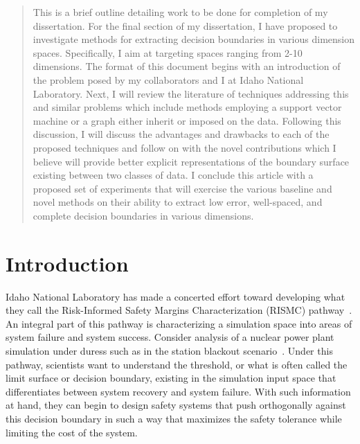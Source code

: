 \documentclass[12pt]{article}
\begin{document}
\maketitle

\begin{abstract}
This is a brief outline detailing work to be done for completion of my
dissertation.
%
For the final section of my dissertation, I have proposed to investigate methods
for extracting decision boundaries in various dimension spaces. 
%
Specifically, I aim at targeting spaces ranging from 2-10 dimensions.
%
The format of this document begins with an introduction of the problem posed by
my collaborators and I at Idaho National Laboratory.
%
Next, I will review the literature of techniques addressing this and similar
problems which include methods employing a support vector machine or a graph
either inherit or imposed on the data.
%
Following this discussion, I will discuss the advantages and drawbacks to each
of the proposed techniques and follow on with the novel contributions which I
believe will provide better explicit representations of the boundary surface
existing between two classes of data.
%
I conclude this article with a proposed set of experiments that will exercise
the various baseline and novel methods on their ability to extract low error,
well-spaced, and complete decision boundaries in various dimensions.
\end{abstract}

\section{Introduction}

Idaho National Laboratory has made a concerted effort toward developing what
they call the Risk-Informed Safety Margins Characterization (RISMC)
pathway~\cite{YoungbloodMousseauKelly2010}.
%
An integral part of this pathway is characterizing a simulation space into areas
of system failure and system success.
%
Consider analysis of a nuclear power plant simulation under duress such as in
the station blackout scenario~\cite{MaljovecLiuWang2015}.
%
Under this pathway, scientists want to understand the threshold, or what is
often called the limit surface or decision boundary, existing in the simulation
input space that differentiates between system recovery and system failure.
%
With such information at hand, they can begin to design safety systems that push
orthogonally against this decision boundary in such a way that maximizes the
safety tolerance while limiting the cost of the system.
\end{document}
